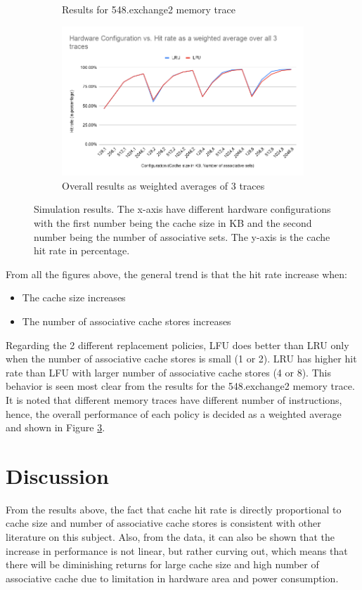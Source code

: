 \documentclass[letterpaper, 11pt]{article}
\begin{document}
\begin{figure}[ht!]
\begin{subfigure}[b]{.48\linewidth}
			\caption{Results for 548.exchange2 memory trace}
			\label{fig2c}
		\end{subfigure}
		\begin{subfigure}[b]{.48\linewidth}
			\includegraphics[width=\textwidth]{all_weighted_avg_results.png}
			\caption{Overall results as weighted averages of 3 traces}
			\label{fig2d}
		\end{subfigure}
		\caption{Simulation results. The x-axis have different hardware configurations with the first number being the cache size in KB and the second number being the number of associative sets. The y-axis is the cache hit rate in percentage.}
	\end{figure}
	
	From all the figures above, the general trend is that the hit rate increase when:
	\begin{itemize}
		\item The cache size increases
		\item The number of associative cache stores increases
	\end{itemize}

	Regarding the 2 different replacement policies, LFU does better than LRU only when the number of associative cache stores is small (1 or 2). LRU has higher hit rate than LFU with larger number of associative cache stores (4 or 8). This behavior is seen most clear from the results for the 548.exchange2 memory trace. It is noted that different memory traces have different number of instructions, hence, the overall performance of each policy is decided as a weighted average and shown in Figure \ref{fig2d}. 

\section{Discussion}
	From the results above, the fact that cache hit rate is directly proportional to cache size and number of associative cache stores is consistent with other literature on this subject. Also, from the data, it can also be shown that the increase in performance is not linear, but rather curving out, which means that there will be diminishing returns for large cache size and high number of associative cache due to limitation in hardware area and power consumption. 
\end{document}
